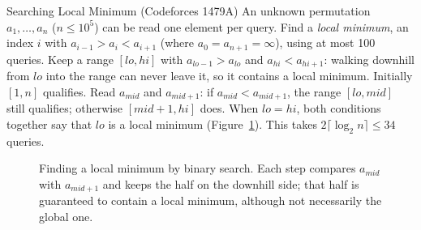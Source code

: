 \begin{problem}{Searching Local Minimum (Codeforces 1479A)}
An unknown permutation $a_1, \ldots, a_n$ ($n \le 10^5$) can be read one element per query. Find a \emph{local minimum},
an index $i$ with $a_{i-1} > a_i < a_{i+1}$ (where $a_0 = a_{n+1} = \infty$), using at most 100 queries.
\solution Keep a range $[lo, hi]$ with $a_{lo - 1} > a_{lo}$ and $a_{hi} < a_{hi + 1}$: walking downhill from $lo$ into the
range can never leave it, so it contains a local minimum. Initially $[1, n]$ qualifies. Read $a_{mid}$ and $a_{mid+1}$: if
$a_{mid} < a_{mid+1}$, the range $[lo, mid]$ still qualifies; otherwise $[mid + 1, hi]$ does. When $lo = hi$, both
conditions together say that $lo$ is a local minimum (Figure~\ref{fig:localmin}). This takes $2\lceil\log_2 n\rceil \le 34$
queries.
\end{problem}

\begin{figure}[htbp]
\centering
{}
\caption{Finding a local minimum by binary search. Each step compares $a_{mid}$ with $a_{mid+1}$ and keeps the half on the
downhill side; that half is guaranteed to contain a local minimum, although not necessarily the global one.}
\label{fig:localmin}
\end{figure}

